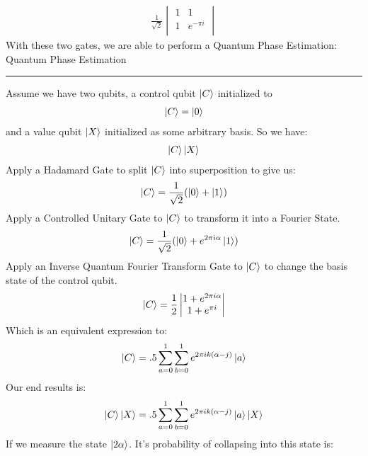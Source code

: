 \documentclass[conference]{IEEEtran}
\begin{document}
\begin{align*}
\frac{1}{\sqrt{2}}
    \begin{vmatrix}
    1 & 1 \\
    1 & e^{-\pi i} \\
    \end{vmatrix} 
\end{align*} 
\indent With these two gates, we are able to perform a Quantum Phase Estimation:\newline
\newline
{\large Quantum Phase Estimation} \newline
\noindent\rule{\columnwidth}{1pt}
Assume we have two qubits, a control qubit $\ket{C}$ initialized to
\begin{align*}
\ket{C} = \ket{0}
\end{align*} 
and a value qubit $\ket{X}$ initialized as some arbitrary basis. So we have: 
\begin{align*}
\ket{C} \ket{X}
\end{align*} 
\newline 
Apply a Hadamard Gate to split $\ket{C}$ into superposition to give us:
\begin{align*}
    \ket{C} = \frac{1}{\sqrt{2}}(\ket{0}+ \ket{1}) 
\end{align*}
Apply a Controlled Unitary Gate to $\ket{C}$ to transform it into a Fourier State. 
\begin{align*}
    \ket{C} = \frac{1}{\sqrt{2}}(\ket{0}+ e^{2 \pi i \alpha}\ket{1}) 
\end{align*}
Apply an Inverse Quantum Fourier Transform Gate to $\ket{C}$ to change the basis state of the control qubit.
\begin{align*}
    \ket{C} = \frac{1}{2}     \begin{vmatrix}
    1 + e^{2 \pi i \alpha} \\
    1 + e^{\pi i} \\
    \end{vmatrix} 
\end{align*}
Which is an equivalent expression to: 
\begin{align*}
    \ket{C} = .5 \sum_{a = 0}^1 \sum_{b = 0}^1 e^{2\pi i k(\alpha - j)}\ket{a}
\end{align*}
Our end results is: 
\begin{align*}
\ket{C} \ket{X} = .5 \sum_{a = 0}^1 \sum_{b = 0}^1 e^{2\pi i k(\alpha - j)}\ket{a} \ket{X}
\end{align*} 
If we measure the state $\ket{2 \alpha}$. It's probability of collapsing into this state is: 
\end{document}
